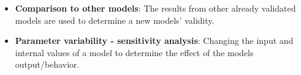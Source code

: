 \begin{frame}
	\begin{itemize}
	  \item \textbf{Comparison to other models}: The results from other already
  validated models are used to determine a new models' validity.
	  \item \textbf{Parameter variability - sensitivity analysis}: Changing the
  input and internal values of a model to determine the effect of the models
  output/behavior.
	\end{itemize}
\end{frame}